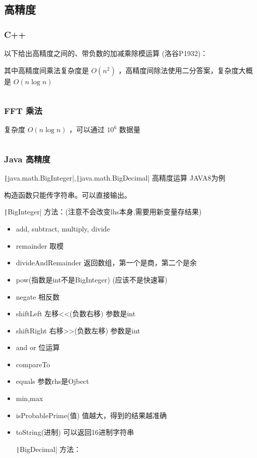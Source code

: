 \documentclass[twocolumn,10pt]{ctexart}
\begin{document}
\subsection{高精度}

\subsubsection{C++}

以下给出高精度之间的、带负数的加减乘除模运算 (洛谷P1932)：

其中高精度间乘法复杂度是 $O(n^2)$ ，高精度间除法使用二分答案，复杂度大概是 $O(n\log n)$

\inputminted{cpp}{code/ext_075.cpp}

\subsubsection{FFT 乘法}

复杂度 $O(n\log n)$ ，可以通过 $10^6$ 数据量

\inputminted{cpp}{code/p1919_a_mul_b_fft.cpp}

\subsubsection{Java 高精度}

\texttt|java.math.BigInteger|,\texttt|java.math.BigDecimal| 高精度运算 JAVA8为例

构造函数只能传字符串。可以直接输出。

\texttt|BigInteger| 方法：(注意不会改变lhs本身,需要用新变量存结果)

\begin{itemize}
\item add, subtract, multiply, divide
\item remainder 取模
\item divideAndRemainder 返回数组，第一个是商，第二个是余
\item pow(指数是int不是BigInteger) (应该不是快速幂)
\item negate 相反数
\item shiftLeft 左移<<(负数右移) 参数是int
\item shiftRight 右移>>(负数左移) 参数是int
\item and or 位运算
\item compareTo
\item equals 参数rhs是Ojbect
\item min,max
\item isProbablePrime(值) 值越大，得到的结果越准确
\item toString(进制) 可以返回16进制字符串

\texttt|BigDecimal| 方法：
\end{itemize}
\end{document}
